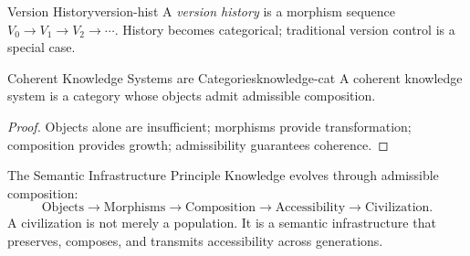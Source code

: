 \begin{definition}{Version History}{version-hist}
  A \emph{version history} is a morphism sequence
  $V_0 \to V_1 \to V_2 \to \cdots$. History becomes categorical;
  traditional version control is a special case.
\end{definition}

\begin{theorem}{Coherent Knowledge Systems are Categories}{knowledge-cat}
  A coherent knowledge system is a category whose objects admit
  admissible composition.
\end{theorem}
\begin{proof}
  Objects alone are insufficient; morphisms provide transformation;
  composition provides growth; admissibility guarantees coherence.
\end{proof}

\begin{namedthm}{The Semantic Infrastructure Principle}
  Knowledge evolves through admissible composition:
  \[
    \text{Objects} \to \text{Morphisms} \to \text{Composition}
    \to \text{Accessibility} \to \text{Civilization.}
  \]
  A civilization is not merely a population. It is a semantic
  infrastructure that preserves, composes, and transmits accessibility
  across generations.
\end{namedthm}
